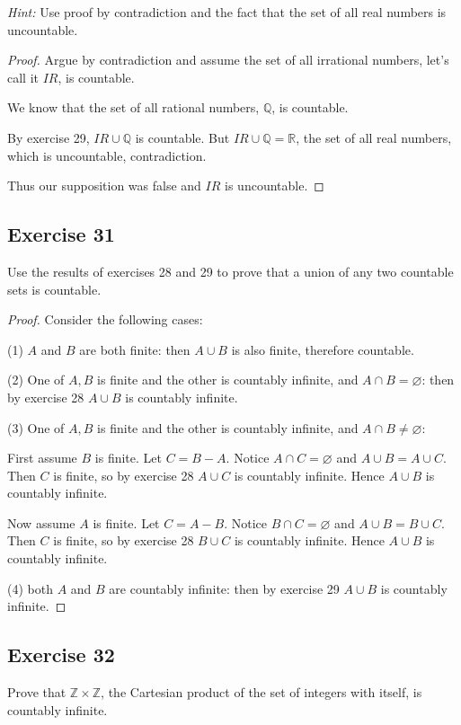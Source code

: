 \documentclass[14pt]{extarticle}
\newcommand{\es}{\varnothing}
\newcommand{\R}{\mathbb{R}}
\newcommand{\Q}{\mathbb{Q}}
\newcommand{\Z}{\mathbb{Z}}
\begin{document}
{\it Hint:} Use proof by contradiction and the fact that the set of all real numbers is uncountable.

\begin{proof}
Argue by contradiction and assume the set of all irrational numbers, let's call it $IR$, is countable.

We know that the set of all rational numbers, $\Q$, is countable.

By exercise 29, \(IR \cup \Q\) is countable. But \(IR \cup \Q = \R\), the set of all real numbers, which is 
uncountable, contradiction.

Thus our supposition was false and $IR$ is uncountable.
\end{proof}

\subsection{Exercise 31}
Use the results of exercises 28 and 29 to prove that a union of any two countable sets is countable.

\begin{proof}
Consider the following cases: 

(1) $A$ and $B$ are both finite: then \(A \cup B\) is also finite, therefore countable.

(2) One of $A, B$ is finite and the other is countably infinite, and \(A \cap B = \es\): then by exercise 28 
\(A \cup B\) is countably infinite.

(3) One of $A, B$ is finite and the other is countably infinite, and \(A \cap B \neq \es\): 

First assume $B$ is finite. Let \(C = B - A\). Notice \(A \cap C = \es\) and \(A \cup B = A \cup C\). Then $C$ is finite, so by exercise 28 \(A \cup C\) is countably infinite. Hence \(A \cup B\) is countably infinite.

Now assume $A$ is finite. Let \(C = A - B\). Notice \(B \cap C = \es\) and \(A \cup B = B \cup C\). Then $C$ is finite, so by exercise 28 \(B \cup C\) is countably infinite. Hence \(A \cup B\) is countably infinite.

(4) both $A$ and $B$ are countably infinite: then by exercise 29 \(A \cup B\) is countably infinite.
\end{proof}

\subsection{Exercise 32}
Prove that \(\Z \times \Z\), the Cartesian product of the set of integers with itself, is countably infinite.
\end{document}
